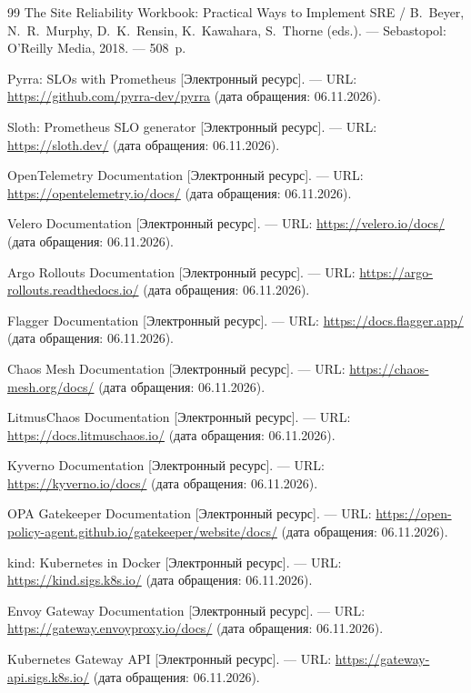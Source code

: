 \begin{thebibliography}{99}
 The Site Reliability Workbook: Practical Ways to
  Implement SRE / B.~Beyer, N.~R.~Murphy, D.~K.~Rensin, K.~Kawahara,
  S.~Thorne (eds.). --- Sebastopol: O'Reilly Media, 2018. --- 508~p.

 Pyrra: SLOs with Prometheus [Электронный ресурс]. --- URL:
  \url{https://github.com/pyrra-dev/pyrra} (дата обращения: 06.11.2026).

 Sloth: Prometheus SLO generator [Электронный ресурс]. ---
  URL: \url{https://sloth.dev/} (дата обращения: 06.11.2026).

 OpenTelemetry Documentation [Электронный ресурс]. --- URL:
  \url{https://opentelemetry.io/docs/} (дата обращения: 06.11.2026).

 Velero Documentation [Электронный ресурс]. --- URL:
  \url{https://velero.io/docs/} (дата обращения: 06.11.2026).

 Argo Rollouts Documentation [Электронный ресурс]. ---
  URL: \url{https://argo-rollouts.readthedocs.io/} (дата обращения:
  06.11.2026).

 Flagger Documentation [Электронный ресурс]. --- URL:
  \url{https://docs.flagger.app/} (дата обращения: 06.11.2026).

 Chaos Mesh Documentation [Электронный ресурс]. ---
  URL: \url{https://chaos-mesh.org/docs/} (дата обращения: 06.11.2026).

 LitmusChaos Documentation [Электронный ресурс]. --- URL:
  \url{https://docs.litmuschaos.io/} (дата обращения: 06.11.2026).

 Kyverno Documentation [Электронный ресурс]. --- URL:
  \url{https://kyverno.io/docs/} (дата обращения: 06.11.2026).

 OPA Gatekeeper Documentation [Электронный ресурс]. ---
  URL: \url{https://open-policy-agent.github.io/gatekeeper/website/docs/}
  (дата обращения: 06.11.2026).

 kind: Kubernetes in Docker [Электронный ресурс]. --- URL:
  \url{https://kind.sigs.k8s.io/} (дата обращения: 06.11.2026).

 Envoy Gateway Documentation [Электронный ресурс]. ---
  URL: \url{https://gateway.envoyproxy.io/docs/} (дата обращения: 06.11.2026).

 Kubernetes Gateway API [Электронный ресурс]. --- URL:
  \url{https://gateway-api.sigs.k8s.io/} (дата обращения: 06.11.2026).


\end{thebibliography}
